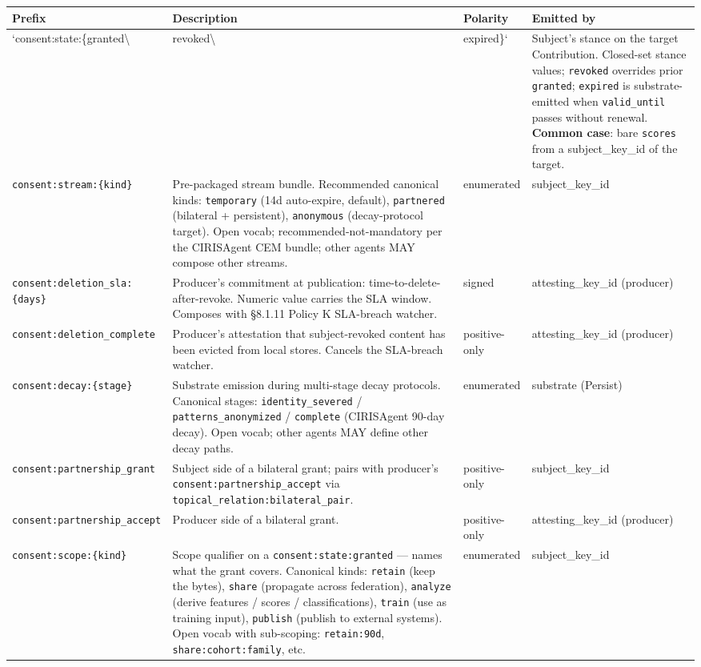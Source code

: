 \documentclass[11pt]{article}
\begin{document}
{\scriptsize
\begin{longtable}{|p{4.0cm}|p{4.0cm}|p{4.0cm}|p{4.0cm}|}\hline
\textbf{Prefix} & \textbf{Description} & \textbf{Polarity} & \textbf{Emitted by} \\ \hline\endhead
`consent:state:\{granted\textbackslash{} & revoked\textbackslash{} & expired\}` & Subject's stance on the target Contribution. Closed-set stance values; \texttt{revoked} overrides prior \texttt{granted}; \texttt{expired} is substrate-emitted when \texttt{valid\_until} passes without renewal. \textbf{Common case}: bare \texttt{scores} from a subject\_key\_id of the target. \\ \hline
\texttt{consent:stream:\{kind\}} & Pre-packaged stream bundle. Recommended canonical kinds: \texttt{temporary} (14d auto-expire, default), \texttt{partnered} (bilateral + persistent), \texttt{anonymous} (decay-protocol target). Open vocab; recommended-not-mandatory per the CIRISAgent CEM bundle; other agents MAY compose other streams. & enumerated & subject\_key\_id \\ \hline
\texttt{consent:deletion\_sla:\{days\}} & Producer's commitment at publication: time-to-delete-after-revoke. Numeric value carries the SLA window. Composes with §8.1.11 Policy K SLA-breach watcher. & signed & attesting\_key\_id (producer) \\ \hline
\texttt{consent:deletion\_complete} & Producer's attestation that subject-revoked content has been evicted from local stores. Cancels the SLA-breach watcher. & positive-only & attesting\_key\_id (producer) \\ \hline
\texttt{consent:decay:\{stage\}} & Substrate emission during multi-stage decay protocols. Canonical stages: \texttt{identity\_severed} / \texttt{patterns\_anonymized} / \texttt{complete} (CIRISAgent 90-day decay). Open vocab; other agents MAY define other decay paths. & enumerated & substrate (Persist) \\ \hline
\texttt{consent:partnership\_grant} & Subject side of a bilateral grant; pairs with producer's \texttt{consent:partnership\_accept} via \texttt{topical\_relation:bilateral\_pair}. & positive-only & subject\_key\_id \\ \hline
\texttt{consent:partnership\_accept} & Producer side of a bilateral grant. & positive-only & attesting\_key\_id (producer) \\ \hline
\texttt{consent:scope:\{kind\}} & Scope qualifier on a \texttt{consent:state:granted} — names what the grant covers. Canonical kinds: \texttt{retain} (keep the bytes), \texttt{share} (propagate across federation), \texttt{analyze} (derive features / scores / classifications), \texttt{train} (use as training input), \texttt{publish} (publish to external systems). Open vocab with sub-scoping: \texttt{retain:90d}, \texttt{share:cohort:family}, etc. & enumerated & subject\_key\_id \\ \hline
\end{longtable}}
\end{document}
